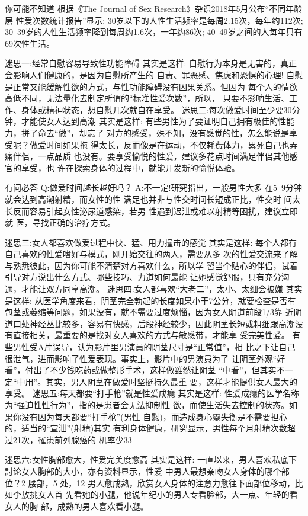 \documentclass[12pt,UTF8]{ctexbook}
\begin{document}
你可能不知道
根据《The Journal of Sex Research》杂识2018年5月公布“不同年龄层
性爱次数统计报告”显示:
30岁以下的人性生活频率是每周2.15次，每年约112次;
30~39岁的人性生活频率降到每周约1.6次，一年约86次;
40~49岁之间的人每年只有69次性生活。

迷思一:经常自慰容易导致性功能障碍
其实是这样:
自慰行为本身是无害的，真正会影响人们健康的，是因为自慰所产生的
自责、罪恶感、焦虑和恐惧的心理!
自慰是正常又能缓解性欲的方式，与性功能障碍没有因果关系。但因为
每个人的情欲高低不同，无法量化去制定所谓的“标准性爱次数”，所以，
只要不影响生活、工作、身体或精神状态，想自慰几次就自在享受。
迷思二:每次做爱时间至少要30分钟，才能使女人达到高潮
其实是这样:
有些男性为了要证明自己拥有极佳的性能力，拼了命去“做”，却忘了
对方的感受，殊不知，没有感觉的性，怎么能说是享受呢？做爱时间如果拖
得太长，反而像是在运动，不仅耗费体力，累死自己也弄痛伴侣，一点品质
也没有。要享受愉悦的性爱，建议多花点时间满足伴侣其他感官的享受，也
许在探索身体的过程中，就能开发新的愉悦体验。

有问必答
Q:做爱时间越长越好吗？
A:不一定!研究指出，一般男性大多
在5~9分钟就会达到高潮射精，而女性的性
满足也并非与性交时间长短成正比，性交时
间太长反而容易引起女性泌尿道感染，若男
性遇到迟泄或难以射精等困扰，建议立即就
医，寻找正确的治疗方式。

迷思三:女人都喜欢做爱过程中快、猛、用力撞击的感觉
其实是这样:
每个人都有自己喜欢的性爱嗜好与模式，刚开始交往的两人，需要从多
次的性爱交流来了解与熟悉彼此，因为你可能不清楚对方喜欢什么，所以学
習当个贴心的伴侣，试着引导对方说出什么方式、哪些技巧、力道如何最能
让她感觉舒服，只有充分沟通，才能让双方同享高潮。
迷思四:女人都喜欢“大老二”，太小、太细会被嫌
其实是这样:
从医学角度来看，阴茎完全勃起的长度如果小于7公分，就要检查是否有
包茎或萎缩等问题，如果没有，就不需要过度烦惱，因为女人阴道前段1/3靠
近阴道口处神经丛比较多，容易有快感，后段神经较少，因此阴茎长短或粗细跟高潮没有直接相关，最重要的是找对女人喜欢的方式与敏感带，才能享
受完美性爱。
有些男性受A片误导，认为影片里男演員的阴茎尺寸是“正常值”，相
比之下让自己很泄气，进而影响了性爱表现。事实上，影片中的男演員为了
让阴茎外观“好看”，付出了不少钱吃药或做整形手术，这样做雖然让阴茎
“中看”，但其实不一定“中用”。其实，男人阴茎在做爱时坚挺持久最重
要，这样才能提供女人最大的享受。
迷思五:每天都要“打手枪”就是性爱成癮
其实是这样:
性爱成癮的医学名称为“强迫性性行为”，指的是患者会无法抑制性
欲，而使生活失去控制的状态。如果你没有因为每天都要“打手枪”(男性
自慰)，而造成身心靈失衡是不需要担心的，适当的“宣泄”(射精)其实
有利身体健康，研究显示，男性每个月射精次数超过21次，罹患前列腺癌的
机率少33%

迷思六:女性胸部愈大，性爱完美度愈高
其实是这样:
一直以来，男人喜欢私底下討论女人胸部的大小，亦有资料显示，性爱
中男人最想亲吻女人身体的哪个部位？2%
腰部，5%
处，12%
男人愈成熟，欣赏女人身体的注意力愈往下面部位移动，比如李敖挑女人首
先看她的小腿，他说年纪小的男人专看脸部，大一点、年轻的看女人的胸
部，成熟的男人喜欢看小腿。
\end{document}
